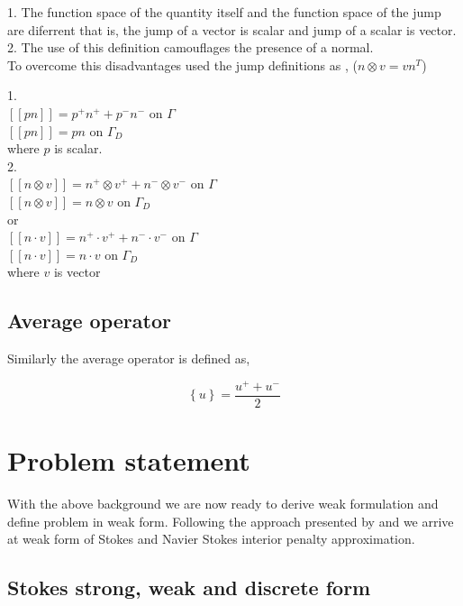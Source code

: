 \documentclass[a4paper,12pt]{book}
\begin{document}
1. The function space of the quantity itself and the function space of the jump are diferrent that is, the jump of a vector is scalar and jump of a scalar is vector.\\
2. The use of this definition camouflages the presence of a normal.\\

To overcome this disadvantages \cite{Montlaur2} used the jump definitions as ,
($n \otimes v = v n^T$)

1. \\
$[[pn]] = p^+ n^+ + p^- n^- $ on $\Gamma$\\
$[[pn]] = p n $ on $\Gamma_D$\\
where $p$ is scalar. \\

2. \\
$[[n \otimes v]] = n^+ \otimes v^+ + n^- \otimes v^-$ on $\Gamma$\\
$[[n \otimes v]] = n \otimes v$ on $\Gamma_D$\\
 or \\
$[[n \cdot v]] = n^+ \cdot v^+ + n^- \cdot v^-$ on $\Gamma$\\
$[[n \cdot v]] = n \cdot v$ on $\Gamma_D$\\
where $v$ is vector\\

\subsection{Average operator}

Similarly the average operator is defined as,

\begin{equation}\label{average operator}
\left\lbrace u \right\rbrace = \frac{u^+ + u^-}{2}  
\end{equation} 

\section{Problem statement}

With the above background we are now ready to derive weak formulation and define problem in weak form. Following the approach presented by \cite{Montlaur} and \cite{Montlaur2} we arrive at weak form of Stokes and Navier Stokes interior penalty approximation.

\subsection{Stokes strong, weak and discrete form} \label{Stokes_flow_ch3}
\end{document}

